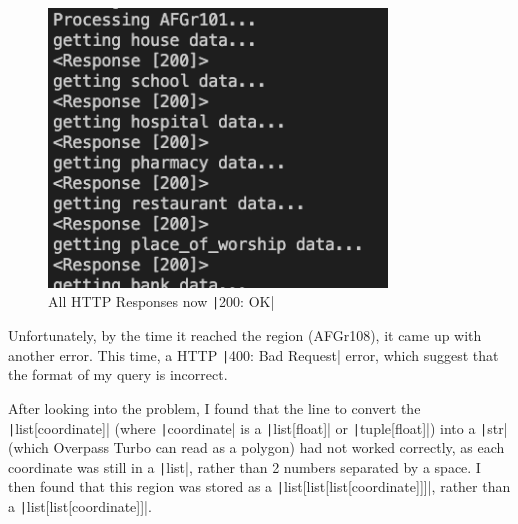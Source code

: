 \documentclass[12pt]{report}
\newcommand{\pil}[1]{\protect\texttt|#1|}
\begin{document}
\begin{center}
\end{center}

\begin{figure}[H]
\centering
\includegraphics[width=9cm]{ss5.7.png}
\caption{All HTTP Responses now \pil{200: OK}}\label{fig:ss5.7}
\end{figure}

Unfortunately, by the time it reached the  region (AFGr108), it came up with another error. This time, a HTTP \pil{400: Bad Request} error, which suggest that the format of my query is incorrect.

After looking into the problem, I found that the line to convert the \pil{list[coordinate]} (where \pil{coordinate} is a \pil{list[float]} or \pil{tuple[float]}) into a \pil{str} (which Overpass Turbo can read as a polygon) had not worked correctly, as each coordinate was still in a \pil{list}, rather than 2 numbers separated by a space. I then found that this region was stored as a \pil{list[list[list[coordinate]]]}, rather than a \pil{list[list[coordinate]]}.
\end{document}
